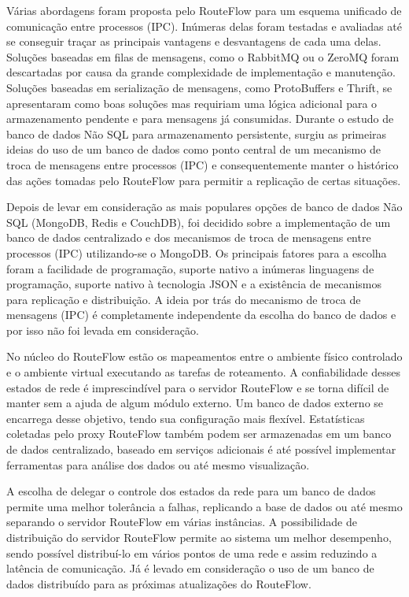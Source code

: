 Várias abordagens foram proposta pelo RouteFlow para um
esquema unificado de comunicação entre processos (IPC). 
Inúmeras delas foram testadas e avaliadas até se conseguir 
traçar as principais vantagens e desvantagens de cada uma delas.
Soluções baseadas em filas de mensagens, como o RabbitMQ
ou o ZeroMQ foram descartadas por causa da grande complexidade
de implementação e manutenção. Soluções baseadas em serialização
de mensagens, como ProtoBuffers e Thrift, se apresentaram como
boas soluções mas requiriam uma lógica adicional para o armazenamento
pendente e para mensagens já consumidas. Durante o estudo
de banco de dados Não SQL para armazenamento persistente,
surgiu as primeiras ideias do uso de um banco de dados como
ponto central de um mecanismo de troca de mensagens entre 
processos (IPC) e consequentemente manter o histórico das 
ações tomadas pelo RouteFlow para permitir a replicação de certas
situações.

Depois de levar em consideração as mais populares opções de 
banco de dados Não SQL (MongoDB, Redis e CouchDB), foi 
decidido sobre a implementação de um banco de dados centralizado
e dos mecanismos de troca de mensagens entre processos (IPC) 
utilizando-se o MongoDB. Os principais fatores para a escolha foram
a facilidade de programação, suporte nativo a inúmeras linguagens de 
programação, suporte nativo à tecnologia JSON e a existência de 
mecanismos para replicação e distribuição. A ideia por trás do
mecanismo de troca de mensagens (IPC) é completamente
independente da escolha do banco de dados e por isso não 
foi levada em consideração.

No núcleo do RouteFlow estão os mapeamentos entre o ambiente
físico controlado e o ambiente virtual executando as tarefas de
roteamento. A confiabilidade desses estados de rede é imprescindível 
para o servidor RouteFlow e se torna difícil de manter sem a ajuda de 
algum módulo externo. Um banco de dados externo se encarrega
desse objetivo, tendo sua configuração mais flexível. Estatísticas
coletadas pelo proxy RouteFlow também podem ser armazenadas em 
um banco de dados centralizado, baseado em serviços adicionais
é até possível implementar ferramentas para análise dos dados 
ou até mesmo visualização.

A escolha de delegar o controle dos estados da rede para um
banco de dados permite uma melhor tolerância a falhas, replicando
a base de dados ou até mesmo separando o servidor RouteFlow em várias
instâncias. A possibilidade de distribuição do servidor RouteFlow permite
ao sistema um melhor desempenho, sendo possível distribuí-lo
em vários pontos de uma rede e assim reduzindo a latência de
comunicação. Já é levado em consideração o uso de um banco de
dados distribuído para as próximas atualizações do RouteFlow.

